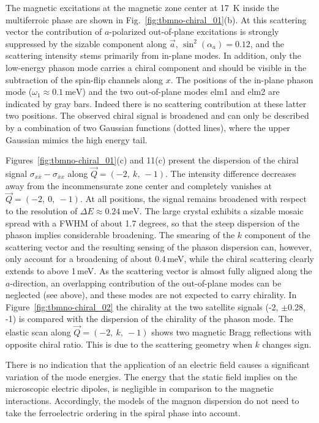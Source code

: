 \documentclass[aps,prb,twocolumn,superscriptaddress,showpacs,floatfix]{revtex4-2}
\newcommand{\aaxis}{$\vec{a}$}
\begin{document}
The magnetic excitations at the magnetic zone center at \SI{17}{\kelvin} inside the multiferroic phase are shown in Fig.~\ref{fig:tbmno-chiral_01}(b). At this scattering vector the contribution of $a$-polarized out-of-plane excitations is strongly suppressed by the sizable component along \aaxis , $\sin^2(\alpha_a)=0.12$, and the scattering intensity stems primarily from in-plane modes. In addition, only the low-energy phason mode carries a chiral component and should be visible in the subtraction of the spin-flip channels along $x$. The positions of the in-plane phason mode ($\omega_1\approx\SI{0.1}{\meV}$) and the two out-of-plane modes elm1 and elm2 are indicated by gray bars. Indeed there is no scattering contribution at these latter two positions. The observed chiral signal is broadened and can only be described by a combination of two Gaussian functions (dotted lines), where the upper Gaussian mimics the high energy tail.

Figures~\ref{fig:tbmno-chiral_01}(c) and 11(c) present the dispersion of the chiral signal $\sigma_{x\bar{x}}-\sigma_{\bar{x}x}$ along $\vec{Q}=(-2,~k,~-1)$.
The intensity difference decreases away from the incommensurate zone center and completely vanishes at $\vec{Q}=(-2,~0,~-1)$.
At all positions, the signal remains broadened with respect to the resolution of $\Delta E\approx\SI{0.24}{\meV}$.
The large crystal exhibits a sizable mosaic spread with a FWHM of about 1.7 degrees, so that
the steep dispersion of the phason implies considerable broadening. The smearing of the $k$ component of
the scattering vector and the resulting sensing of the phason dispersion can, however, only account for a
broadening of about 0.4\,meV, while the chiral scattering clearly extends to above 1\,meV.
As the scattering vector is almost fully aligned along the $a$-direction, an overlapping contribution of the out-of-plane modes can be neglected (see above), and these modes are not expected to carry chirality.
In Figure~\ref{fig:tbmno-chiral_02} the chirality at the two  satellite signals (-2, $\pm$0.28, -1) is compared with the dispersion of the chirality of the phason mode.
The elastic scan along $\vec{Q}=(-2,~k,~-1)$ shows two magnetic Bragg reflections with opposite chiral ratio. This is due to the scattering geometry when $k$ changes sign.

There is no indication that the application of an electric field causes a significant variation of the mode energies.
The energy that the static field implies on the microscopic electric dipoles, is negligible in comparison to the magnetic interactions.
Accordingly, the models of the magnon dispersion do not need to take the ferroelectric ordering in the spiral phase into account.
\end{document}
